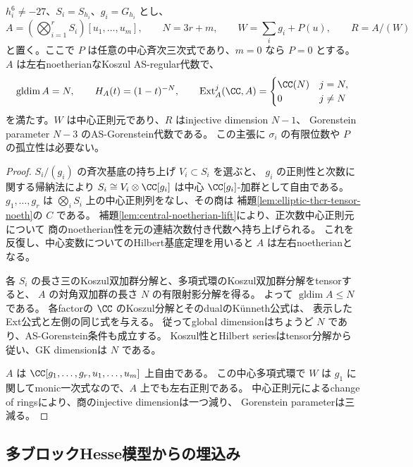 \begin{proposition}[周囲のテンソル積]
\label{prop:tensor-sklyanin-ambient}
 \(h_i^6\ne-27\)、\(S_i=S_{h_i}\)、\(g_i=G_{h_i}\) とし、
 \[
 A=(\bigotimes_{i=1}^rS_i)[u_1,\ldots,u_m],\qquad
 N=3r+m,\qquad W=\sum_i g_i+P(u),\qquad R=A/(W)
 \]
 と置く。ここで \(P\) は任意の中心斉次三次式であり、\(m=0\) なら \(P=0\) とする。
 \(A\) は左右noetherianなKoszul AS-regular代数で、
 \[
 \operatorname{gldim}A=N,\qquad H_A(t)=(1-t)^{-N},\qquad
 \operatorname{Ext}^j_A(\CC,A)=
 \begin{cases}\CC(N)&j=N,\\0&j\ne N\end{cases}
 \]
 を満たす。\(W\) は中心正則元であり、\(R\) はinjective dimension \(N-1\)、
 Gorenstein parameter \(N-3\) のAS-Gorenstein代数である。
 この主張に \(\sigma_i\) の有限位数や \(P\) の孤立性は必要ない。
\end{proposition}
\begin{proof}
 \(S_i/(g_i)\) の斉次基底の持ち上げ \(V_i\subset S_i\) を選ぶと、
 \(g_i\) の正則性と次数に関する帰納法により
 \(S_i\cong V_i\otimes\CC[g_i]\) は中心 \(\CC[g_i]\)-加群として自由である。
 \(g_1,\ldots,g_r\) は \(\bigotimes_iS_i\) 上の中心正則列をなし、その商は
 補題\ref{lem:elliptic-thcr-tensor-noeth}の \(C\) である。
 補題\ref{lem:central-noetherian-lift}により、正次数中心正則元について
 商のnoetherian性を元の連結次数付き代数へ持ち上げられる。
 これを反復し、中心変数についてのHilbert基底定理を用いると \(A\) は左右noetherianとなる。

 各 \(S_i\) の長さ三のKoszul双加群分解と、多項式環のKoszul双加群分解をtensorすると、
 \(A\) の対角双加群の長さ \(N\) の有限射影分解を得る。
 よって \(\operatorname{gldim}A\le N\) である。
 各factorの \(\CC\) のKoszul分解とそのdualのK\"unneth公式は、
 表示したExt公式と左側の同じ式を与える。
 従ってglobal dimensionはちょうど \(N\) であり、AS-Gorenstein条件も成立する。
 Koszul性とHilbert seriesはtensor分解から従い、GK dimensionは \(N\) である。

 \(A\) は \(\CC[g_1,\ldots,g_r,u_1,\ldots,u_m]\) 上自由である。
 この中心多項式環で \(W\) は \(g_1\) に関してmonic一次式なので、\(A\) 上でも左右正則である。
 中心正則元によるchange of ringsにより、商のinjective dimensionは一つ減り、
 Gorenstein parameterは三減る。
\end{proof}

\subsection{多ブロックHesse模型からの埋込み}

